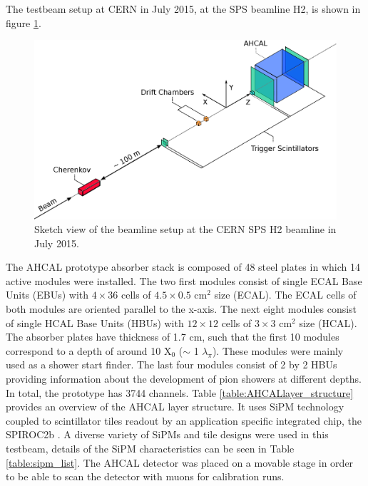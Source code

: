 \documentclass{JINST}
\begin{document}
The testbeam setup at CERN in July 2015, at the SPS beamline H2, is shown in figure \ref{fig:TestbeamScketch}.

\begin{figure}[htbp!]
  \centering
  \includegraphics[width=0.7\linewidth]{fig/TestbeamSetup.eps}
  \caption{Sketch view of the beamline setup at the CERN SPS H2 beamline in July 2015.} \label{fig:TestbeamScketch}
\end{figure}

The AHCAL prototype absorber stack is composed of 48 steel plates in which 14 active modules were installed. The two first modules consist of single ECAL Base Units (EBUs) with $4 \times 36$ cells of $4.5 \times 0.5$ cm$^2$ size (ECAL). The ECAL cells of both modules are oriented parallel to the x-axis. The next eight modules consist of single HCAL Base Units (HBUs) with $12 \times 12$ cells of $3 \times 3$ cm$^2$ size (HCAL). The absorber plates have thickness of 1.7 cm, such that the first 10 modules correspond to a depth of around 10 X$_0$ ($\sim$ 1 $\lambda_{\pi}$). These modules were mainly used as a shower start finder. The last four modules consist of 2 by 2 HBUs providing information about the development of pion showers at different depths. In total, the prototype has 3744 channels. Table \ref{table:AHCALlayer_structure} provides an overview of the AHCAL layer structure. It uses SiPM technology coupled to scintillator tiles readout by an application specific integrated chip, the SPIROC2b \cite{5401891}. A diverse variety of SiPMs and tile designs were used in this testbeam, details of the SiPM characteristics can be seen in Table \ref{table:sipm_list}. The AHCAL detector was placed on a movable stage in order to be able to scan the detector with muons for calibration runs.
\end{document}
